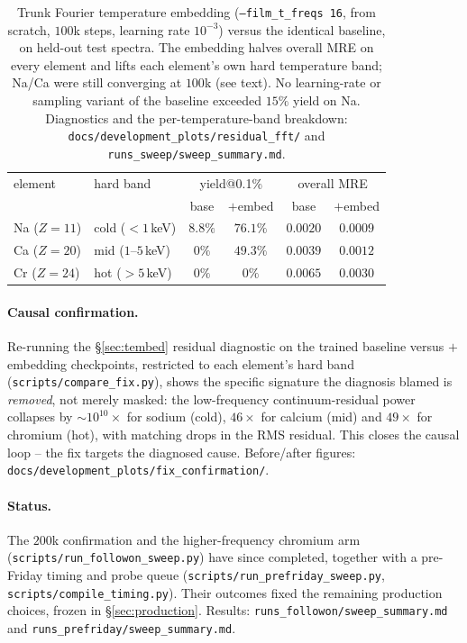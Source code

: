 \documentclass[11pt,a4paper]{article}
\newcommand{\code}[1]{\texttt{#1}}
\begin{document}
\begin{table}[ht]
\centering
\begin{tabular}{llcccc}
\toprule
element & hard band & \multicolumn{2}{c}{yield@0.1\%} &
\multicolumn{2}{c}{overall MRE}\\
 & & base & $+$embed & base & $+$embed\\
\midrule
Na ($Z=11$) & cold ($<1$\,keV)   & $8.8\%$ & $\mathbf{76.1\%}$ & $0.0020$ & $\mathbf{0.0009}$\\
Ca ($Z=20$) & mid ($1$--$5$\,keV) & $0\%$   & $\mathbf{49.3\%}$ & $0.0039$ & $\mathbf{0.0012}$\\
Cr ($Z=24$) & hot ($>5$\,keV)     & $0\%$   & $0\%$             & $0.0065$ & $\mathbf{0.0030}$\\
\bottomrule
\end{tabular}
\caption{Trunk Fourier temperature embedding (\code{--film\_t\_freqs 16},
from scratch, $100$k steps, learning rate $10^{-3}$) versus the identical
baseline, on held-out test spectra. The embedding halves overall MRE on
every element and lifts each element's own hard temperature band; Na/Ca
were still converging at $100$k (see text). No learning-rate or sampling
variant of the baseline exceeded $15\%$ yield on Na. Diagnostics and the
per-temperature-band breakdown:
\code{docs/development\_plots/residual\_fft/} and
\code{runs\_sweep/sweep\_summary.md}.}
\label{tab:tembed}
\end{table}

\paragraph{Causal confirmation.} Re-running the §\ref{sec:tembed}
residual diagnostic on the trained baseline versus $+$embedding
checkpoints, restricted to each element's hard band
(\code{scripts/compare\_fix.py}), shows the specific signature the
diagnosis blamed is \emph{removed}, not merely masked: the low-frequency
continuum-residual power collapses by $\sim10^{10}\times$ for sodium
(cold), $46\times$ for calcium (mid) and $49\times$ for chromium (hot),
with matching drops in the RMS residual. This closes the causal loop --
the fix targets the diagnosed cause. Before/after figures:
\code{docs/development\_plots/fix\_confirmation/}.

\paragraph{Status.} The $200$k confirmation and the higher-frequency
chromium arm (\code{scripts/run\_followon\_sweep.py}) have since completed,
together with a pre-Friday timing and probe queue
(\code{scripts/run\_prefriday\_sweep.py}, \code{scripts/compile\_timing.py}).
Their outcomes fixed the remaining production choices, frozen in
§\ref{sec:production}. Results:
\code{runs\_followon/sweep\_summary.md} and
\code{runs\_prefriday/sweep\_summary.md}.
\end{document}
